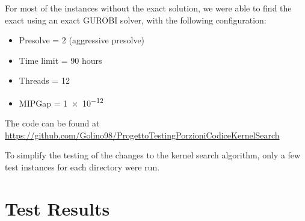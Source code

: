 For most of the instances without the exact solution, we were able to
find the exact using an exact GUROBI solver, with the following configuration:
\begin{itemize}
    \item Presolve = 2 (aggressive presolve)
    \item Time limit = 90 hours
    \item Threads = 12
    \item MIPGap = \num{1e-12}
\end{itemize}

The code can be found at \url{https://github.com/Golino98/ProgettoTestingPorzioniCodiceKernelSearch}

To simplify the testing of the changes to the kernel search algorithm, only
a few test instances for each directory were run.


\section{Test Results}